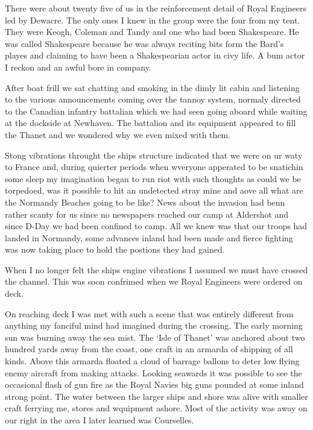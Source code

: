 
There were about twenty five of us in the reinforcement detail of
Royal Engineers led by \lieutenant Dewacre. The only ones I knew in the group
were the four from my tent. They were \corporal Keogh, \sappers Coleman
and Tandy and one who had been Shakespeare. He was called Shakespeare
because he was always reciting bits form the Bard's playes and
claiming to have been a Shakespearian actor in civy life. A bum actor
I reckon and an awful bore in company.

After boat frill we sat chatting and smoking in the dimly lit cabin
and listening to the various announcements coming over the tannoy
system, normaly directed to the Canadian infantry battalian which we
had seen going aboard while waiting at the dockside at Newhaven. The
battalion and its equipment appeared to fill the Thanet and we
wondered why we even mixed with them.

Stong vibrations throught the ships structure indicated that we were
on ur waty to France and, during quierter periods when wveryone
apperated to be snatichin some sleep my imagination began to run riot
with such thoughts as could we be torpedoed, was it possible to hit an
undetected stray mine and aove all what are the Normandy Beaches going
to be like? News about the invasion had benn rather scanty for us
since no newspapers reached our camp at Aldershot and since D-Day we
had been confined to camp. All we knew was that our troops had landed
in Normandy, some advances inland had been made and fierce fighting
was now taking place to hold the postions they had gained.

When I no longer felt the ships engine vibrations I assumed we must
have crossed the channel. This was soon confrimed when we Royal
Engineers were ordered on deck.

On reaching deck I was met with such a scene that was entirely
different from anything my fanciful mind had imagined during the
crossing. The early morning sun was burning away the sea mist. The
`Isle of Thanet' was anchored about two hundred yards away from the
coast, one craft in an armarda of shipping of all kinds. Above this
armarda floated a cloud of barrage ballons to deter low flying enemy
aircraft from making attacks. Looking seawards it was possible to see
the occasional flash of gun fire as the Royal Navies big guns pounded
at some inland strong point. The water between the larger ships and
shore was alive with smaller craft ferrying me, stores and wquipment
ashore. Most of the activity was away on our right in the area I later
learned was Courselles.

